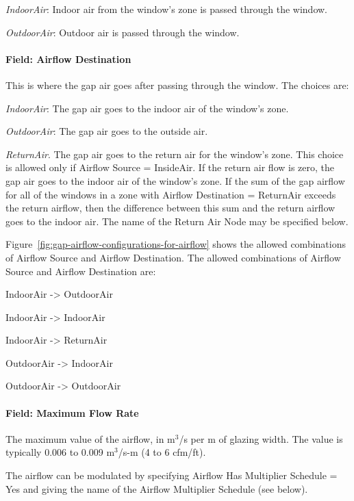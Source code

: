\emph{IndoorAir}: Indoor air from the window's zone is passed through the window.

\emph{OutdoorAir}: Outdoor air is passed through the window.

\paragraph{Field: Airflow Destination}\label{field-airflow-destination}

This is where the gap air goes after passing through the window. The choices are:

\emph{IndoorAir}: The gap air goes to the indoor air of the window's zone.

\emph{OutdoorAir}: The gap air goes to the outside air.

\emph{ReturnAir}. The gap air goes to the return air for the window's zone. This choice is allowed only if Airflow Source = InsideAir. If the return air flow is zero, the gap air goes to the indoor air of the window's zone. If the sum of the gap airflow for all of the windows in a zone with Airflow Destination = ReturnAir exceeds the return airflow, then the difference between this sum and the return airflow goes to the indoor air. The name of the Return Air Node may be specified below.

Figure~\ref{fig:gap-airflow-configurations-for-airflow} shows the allowed combinations of Airflow Source and Airflow Destination. The allowed combinations of Airflow Source and Airflow Destination are:

IndoorAir -\textgreater{} OutdoorAir

IndoorAir -\textgreater{} IndoorAir

IndoorAir -\textgreater{} ReturnAir

OutdoorAir -\textgreater{} IndoorAir

OutdoorAir -\textgreater{} OutdoorAir

\paragraph{Field: Maximum Flow Rate}\label{field-maximum-flow-rate-003}

The maximum value of the airflow, in m\(^{3}\)/s per m of glazing width. The value is typically 0.006 to 0.009 m\(^{3}\)/s-m (4 to 6 cfm/ft).

The airflow can be modulated by specifying Airflow Has Multiplier Schedule = Yes and giving the name of the Airflow Multiplier Schedule (see below).

